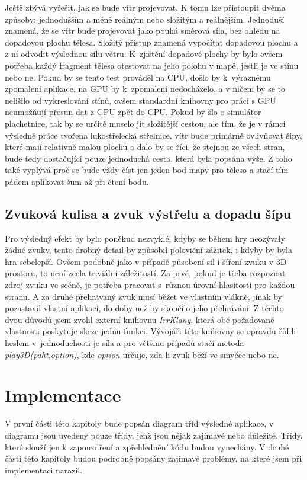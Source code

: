 Ještě zbývá vyřešit, jak se bude vítr projevovat. K tomu lze přistoupit dvěma způsoby: jednodušším a méně reálným nebo složitým a reálnějším. Jednoduší znamená, že se vítr bude projevovat jako pouhá směrová síla, bez ohledu na dopadovou plochu tělesa. Složitý přístup znamená vypočítat dopadovou plochu a z ní odvodit výslednou sílu větru. K~zjištění dopadové plochy by bylo ovšem potřeba každý fragment tělesa otestovat na jeho polohu v mapě, jestli je ve stínu nebo ne. Pokud by se tento test prováděl na CPU, došlo by k~výraznému zpomalení aplikace, na GPU by k~zpomalení nedocházelo, a v ničem by se to nelišilo od vykreslování stínů, ovšem standardní knihovny pro práci s GPU neumožňují přesun dat z GPU zpět do CPU. Pokud by šlo o simulátor plachetnice, tak by se určitě muselo jít složitější cestou, ale tím, že je v rámci výsledné práce tvořena lukostřelecká střelnice, vítr bude primárně ovlivňovat šípy, které mají relativně malou plochu a dalo by se říci, že stejnou ze všech stran, bude tedy dostačující pouze jednoduchá cesta, která byla popsána výše. Z toho také vyplývá proč se bude vždy číst jen jeden bod mapy pro těleso a stačí tím pádem aplikovat šum až při čtení bodu.

\section{Zvuková kulisa a zvuk výstřelu a dopadu šípu}
Pro výsledný efekt by bylo poněkud nezvyklé, kdyby se během hry neozývaly žádné zvuky, tento drobný detail by způsobil poloviční zážitek, i kdyby by byla hra sebelepší. Ovšem podobně jako v případě působení sil i šíření zvuku v 3D prostoru, to není zcela triviální záležitostí. Za prvé, pokud je třeba rozpoznat zdroj zvuku ve scéně, je potřeba pracovat s~různou úrovní hlasitosti pro každou stranu. A za druhé přehrávaný zvuk musí běžet ve vlastním vlákně, jinak by pozastavil vlastní aplikaci, do doby než by skončilo jeho přehrávání. Z těchto dvou důvodů jsem zvolil externí knihovnu \emph{IrrKlang}\cite{irrKlang}, která obě požadované vlastnosti poskytuje skrze jednu funkci. Vývojáři této knihovny se opravdu řídili heslem v~jednoduchosti je síla a pro většinu případů stačí metoda \emph{play3D(paht,option)}, kde \emph{option} určuje, zda-li zvuk běží ve smyčce nebo ne.  
\chapter{Implementace}\label{implementace}
V první části této kapitoly bude popsán diagram tříd výsledné aplikace, v diagramu jsou uvedeny pouze třídy, jenž jsou nějak zajímavé nebo důležité. Třídy, které slouží jen k zapouzdření a zpřehlednění kódu budou vynechány. V druhé části této kapitoly budou podrobně popsány zajímavé problémy, na které jsem při implementaci narazil.  
